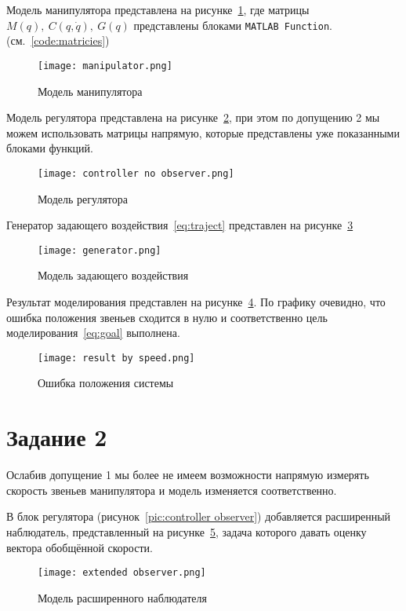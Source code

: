 \documentclass[14pt]{extarticle}
\begin{document}
    \sloppy Модель манипулятора представлена на рисунке~\ref{pic:manipulator}, где матрицы $M(q),\ C(q, \dot{q}),\ G(q)$ представлены блоками
    \texttt{MATLAB Function}. (см.~\ref{code:matricies})
    \begin{figure}[H]
        \centering
        \texttt{[image: manipulator.png]}
        \caption{Модель манипулятора}
        \label{pic:manipulator}
    \end{figure}

    Модель регулятора представлена на рисунке~\ref{pic:controller no observer}, при этом по допущению 2 мы можем использовать
    матрицы напрямую, которые представлены уже показанными блоками функций.
    \begin{figure}[H]
        \centering
        \texttt{[image: controller no observer.png]}
        \caption{Модель регулятора}
        \label{pic:controller no observer}
    \end{figure}

    Генератор задающего воздействия~\eqref{eq:traject} представлен на рисунке~\ref{pic:generator}
    \begin{figure}[H]
        \centering
        \texttt{[image: generator.png]}
        \caption{Модель задающего воздействия}
        \label{pic:generator}
    \end{figure}

    Результат моделирования представлен на рисунке~\ref{pic:result by speed}. По графику очевидно, что ошибка
    положения звеньев сходится в нулю и соответственно цель моделирования~\eqref{eq:goal} выполнена.
    \begin{figure}[H]
        \centering
        \texttt{[image: result by speed.png]}
        \caption{Ошибка положения системы}
        \label{pic:result by speed}
    \end{figure}

    \section*{Задание 2}
    Ослабив допущение 1 мы более не имеем возможности напрямую измерять скорость звеньев манипулятора
    и модель изменяется соответственно.

    В блок регулятора (рисунок~\ref{pic:controller observer}) добавляется расширенный наблюдатель,
    представленный на рисунке~\ref{pic:extended observer}, задача которого давать оценку вектора
    обобщённой скорости.
    \begin{figure}[H]
        \centering
        \texttt{[image: extended observer.png]}
        \caption{Модель расширенного наблюдателя}
        \label{pic:extended observer}
    \end{figure}
\end{document}
